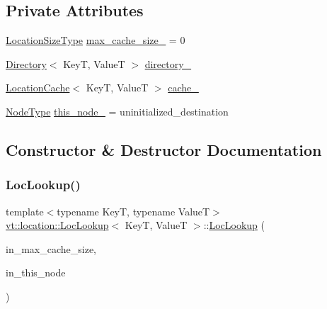 \subsection*{Private Attributes}
\begin{DoxyCompactItemize}
\item 
\hyperlink{namespacevt_1_1location_ab1c4c5849012a23eee2fbd1fce6159d7}{Location\+Size\+Type} \hyperlink{structvt_1_1location_1_1_loc_lookup_a2eea8b65ba775e30bfbe0bb1e2c0ea65}{max\+\_\+cache\+\_\+size\+\_\+} = 0
\item 
\hyperlink{structvt_1_1location_1_1_directory}{Directory}$<$ KeyT, ValueT $>$ \hyperlink{structvt_1_1location_1_1_loc_lookup_aa8a90e2b6ab251ae50425055f071e7c0}{directory\+\_\+}
\item 
\hyperlink{structvt_1_1location_1_1_location_cache}{Location\+Cache}$<$ KeyT, ValueT $>$ \hyperlink{structvt_1_1location_1_1_loc_lookup_a280e82cf82b7d91838e25756013a772c}{cache\+\_\+}
\item 
\hyperlink{namespacevt_a866da9d0efc19c0a1ce79e9e492f47e2}{Node\+Type} \hyperlink{structvt_1_1location_1_1_loc_lookup_aabefd8811a180654fc5b1fba649f32b2}{this\+\_\+node\+\_\+} = uninitialized\+\_\+destination
\end{DoxyCompactItemize}


\subsection{Constructor \& Destructor Documentation}
\mbox{\label{structvt_1_1location_1_1_loc_lookup_a27e5f79af811503f9c0652b9f1be35b8}} 
\subsubsection{\texorpdfstring{Loc\+Lookup()}{LocLookup()}}
{\footnotesize\ttfamily template$<$typename KeyT, typename ValueT$>$ \\
\hyperlink{structvt_1_1location_1_1_loc_lookup}{vt\+::location\+::\+Loc\+Lookup}$<$ KeyT, ValueT $>$\+::\hyperlink{structvt_1_1location_1_1_loc_lookup}{Loc\+Lookup} (\begin{DoxyParamCaption}\item[{\hyperlink{namespacevt_1_1location_ab1c4c5849012a23eee2fbd1fce6159d7}{Location\+Size\+Type} const \&}]{in\+\_\+max\+\_\+cache\+\_\+size,  }\item[{\hyperlink{namespacevt_a866da9d0efc19c0a1ce79e9e492f47e2}{Node\+Type}}]{in\+\_\+this\+\_\+node }\end{DoxyParamCaption})\hspace{0.3cm}{\ttfamily [inline]}}



